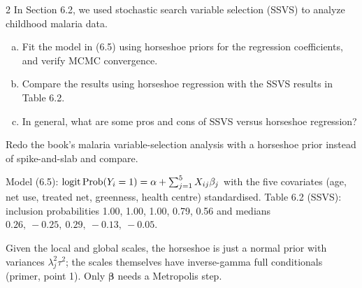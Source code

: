 \documentclass[11pt]{article}
\begin{document}

\begin{problem}{2}
In Section 6.2, we used stochastic search variable selection (SSVS) to analyze childhood malaria data.
\begin{enumerate}[(a)]
\item Fit the model in (6.5) using horseshoe priors for the regression coefficients, and verify MCMC convergence.
\item Compare the results using horseshoe regression with the SSVS results in Table 6.2.
\item In general, what are some pros and cons of SSVS versus horseshoe regression?
\end{enumerate}
\end{problem}

\begin{restate}
Redo the book's malaria variable-selection analysis with a horseshoe prior instead of spike-and-slab and compare.
\end{restate}

\begin{recall}
Model (6.5): $\mathrm{logit}\,\mathrm{Prob}(Y_i=1)=\alpha+\sum_{j=1}^5X_{ij}\beta_j$ with the five covariates (age, net use, treated net, greenness, health centre) standardised. Table 6.2 (SSVS): inclusion probabilities 1.00, 1.00, 1.00, 0.79, 0.56 and medians $0.26,\ -0.25,\ 0.29,\ -0.13,\ -0.05$.
\end{recall}

\begin{keyidea}
Given the local and global scales, the horseshoe is just a normal prior with variances $\lambda_j^2\tau^2$; the scales themselves have inverse-gamma full conditionals (primer, point 1). Only $\bm\beta$ needs a Metropolis step.
\end{keyidea}
\end{document}
